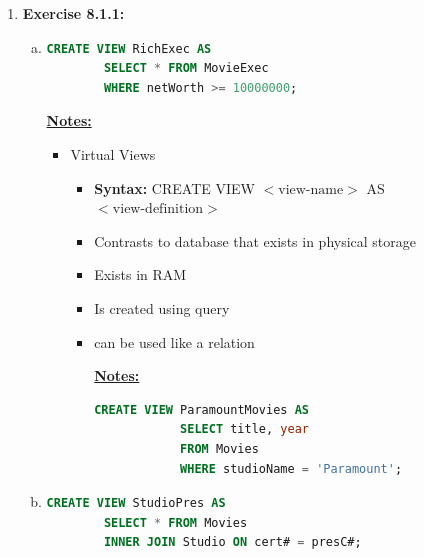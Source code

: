 \documentclass[12pt]{article}
\begin{document}
\begin{enumerate}[1.]
    \item \textbf{Exercise 8.1.1:}

    \bigskip

    \begin{enumerate}[a)]
        \item

    \begin{lstlisting}[language=SQL]
    CREATE VIEW RichExec AS
        SELECT * FROM MovieExec
        WHERE netWorth >= 10000000;
    \end{lstlisting}

        \bigskip

        \underline{\textbf{Notes:}}

        \bigskip

        \begin{itemize}
            \item Virtual Views
            \begin{itemize}
                \item \textbf{Syntax:} CREATE VIEW $<\text{view-name}>$ AS $<\text{view-definition}>$
                \item Contrasts to database that exists in physical storage
                \item Exists in RAM
                \item Is created using query
                \item can be used like a relation

                \bigskip

                \underline{\textbf{Notes:}}

                \bigskip

        \begin{lstlisting}[language=SQL]
        CREATE VIEW ParamountMovies AS
            SELECT title, year
            FROM Movies
            WHERE studioName = 'Paramount';
        \end{lstlisting}
            \end{itemize}
        \end{itemize}

        \item

    \begin{lstlisting}[language=SQL]
    CREATE VIEW StudioPres AS
        SELECT * FROM Movies
        INNER JOIN Studio ON cert# = presC#;
    \end{lstlisting}


\end{enumerate}
\end{enumerate}
\end{document}
